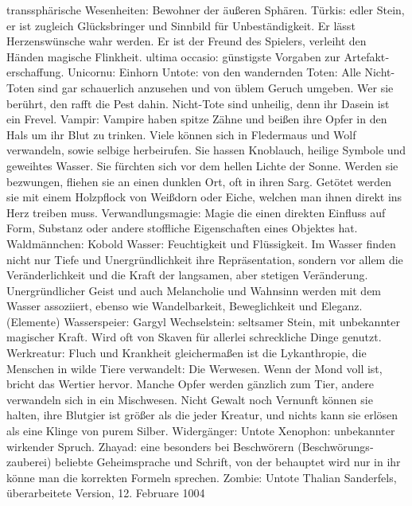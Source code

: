 \documentclass[a5paper,8pt]{book}
\begin{document}
transsphärische Wesenheiten: Bewohner der äußeren \textit{}Sphären.
Türkis: edler Stein, er ist zugleich Glücks­bringer und Sinnbild für Unbeständigkeit. Er lässt Herzenswünsche wahr werden. Er ist der Freund des Spielers, verleiht den Händen magische Flinkheit.
ultima occasio: günstigste Vorgaben zur Artefakt­erschaffung.
Unicornu: \textit{}Einhorn
Untote: von den wandernden Toten: Alle Nicht-Toten sind gar schauerlich anzusehen und von üblem Geruch umgeben. Wer sie berührt, den rafft die Pest dahin. Nicht-Tote sind unheilig, denn ihr Dasein ist ein Frevel.
Vampir: Vampire haben spitze Zähne und beißen ihre Opfer in den Hals um ihr Blut zu trinken. Viele können sich in Fledermaus und Wolf verwandeln, sowie selbige herbeirufen. Sie hassen Knoblauch, heilige Symbole und geweihtes Wasser. Sie fürchten sich vor dem hellen Lichte der Sonne. Werden sie bezwungen, fliehen sie an einen dunklen Ort, oft in ihren Sarg. Getötet werden sie mit einem Holzpflock von Weißdorn oder Eiche, welchen man ihnen direkt ins Herz treiben muss.
Verwandlungsmagie: Magie die einen direkten Einfluss auf Form, Substanz oder andere stoffliche Eigenschaften eines Objektes hat.
Waldmännchen: \textit{}Kobold
Wasser: Feuchtigkeit und Flüssigkeit. Im Wasser finden nicht nur Tiefe und Unergründlichkeit ihre Re­präsen­tation, sondern vor allem die Veränderlichkeit und die Kraft der langsamen, aber stetigen Veränderung. Unergründlicher Geist und auch Melancholie und Wahn­sinn werden mit dem Wasser assoziiert, ebenso wie Wandelbarkeit, Beweglichkeit und Eleganz. (\textit{}Elemente)
Wasserspeier: \textit{}Gargyl
Wechselstein: seltsamer Stein, mit unbekannter magischer Kraft. Wird oft von \textit{}Skaven für allerlei schreckliche Dinge genutzt.
Werkreatur: Fluch und Krankheit gleichermaßen ist die Lykanthropie, die Menschen in wilde Tiere ver­wandelt: Die Werwesen. Wenn der Mond voll ist, bricht das Wertier hervor. Manche Opfer werden gänzlich zum Tier, andere verwandeln sich in ein Mischwesen. Nicht Gewalt noch Vernunft können sie halten, ihre Blutgier ist größer als die jeder Kreatur, und nichts kann sie erlösen als eine Klinge von purem Silber.
Widergänger: \textit{}Untote
Xenophon: unbekannter wirkender Spruch.
Zhayad: eine besonders bei Beschwörern (\textit{}Be­schwörungs­zauberei) beliebte Geheimsprache und Schrift, von der behauptet wird nur in ihr könne man die korrekten Formeln sprechen. 
Zombie: \textit{}Untote
Thalian Sanderfels, überarbeitete Version, 12. Februare 1004

\appendix
\end{document}
